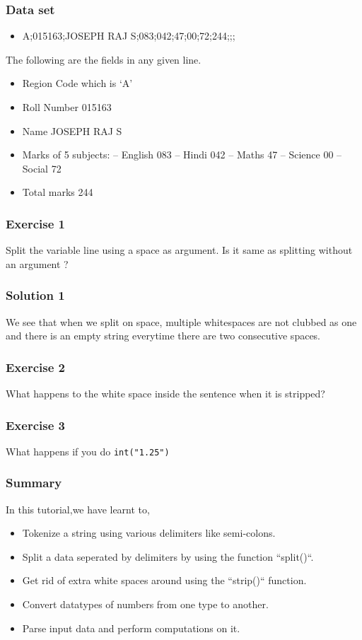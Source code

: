 \documentclass[presentation]{beamer}
\begin{document}
\begin{frame}
\frametitle{Data set}
\label{sec-4}

\begin{itemize}
\item A;015163;JOSEPH RAJ S;083;042;47;00;72;244;;;
\end{itemize}


  The following are the fields in any given line.
\begin{itemize}
\item Region Code which is `A'
\item Roll Number 015163
\item Name JOSEPH RAJ S
\item Marks of 5 subjects: -- English 083 -- 
     Hindi 042 -- Maths 47 --
     Science 00 -- Social 72
\item Total marks 244
\end{itemize}
\end{frame}
\begin{frame}
\frametitle{Exercise 1}
\label{sec-5}

  Split the variable line using a space as argument. Is it same as
  splitting without an argument ?
\end{frame}
\begin{frame}
\frametitle{Solution 1}
\label{sec-6}

  We see that when we split on space, multiple whitespaces are not
  clubbed as one and there is an empty string everytime there are two
  consecutive spaces.
\end{frame}
\begin{frame}
\frametitle{Exercise 2}
\label{sec-7}

  What happens to the white space inside the sentence when it is
  stripped? 
\end{frame}
\begin{frame}
\frametitle{Exercise 3}
\label{sec-8}

  What happens if you do \texttt{int("1.25")}
\end{frame}
\begin{frame}
\frametitle{Summary}
\label{sec-9}


In this tutorial,we have learnt to,
\begin{itemize}
\item Tokenize a string using various delimiters like semi-colons.
\item Split a data seperated by delimiters by using the function ``split()``.
\item Get rid of extra white spaces around using the ``strip()`` function.
\item Convert datatypes of numbers from one type to another.
\item Parse input data and perform computations on it.
\end{itemize}
\end{frame}
\end{document}
